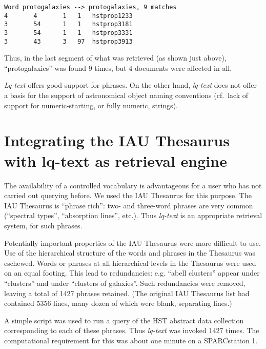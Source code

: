\begin{footnotesize}
\begin{verbatim}
Word protogalaxies --> protogalaxies, 9 matches
4       4       1   1   hstprop1233
3       54      1   1   hstprop3181
3       54      1   1   hstprop3331
3       43      3   97  hstprop3913

\end{verbatim}

\end{footnotesize}

Thus, in the last segment of what was retrieved (as shown just above), 
``protogalaxies'' was found 9 times, but 4 
documents were affected in all.

{\it Lq-text} offers good support for phrases.  
On the 
other hand, {\it lq-text} does not offer a basis for the support of 
astronomical object naming
conventions (cf.\ lack of support for numeric-starting, or fully numeric,
strings).  

\section{Integrating the IAU Thesaurus with lq-text as retrieval engine}

The availability of a controlled vocabulary is advantageous for a user
who has not carried out querying before.  We used the IAU Thesaurus for 
this purpose.  The IAU Thesaurus is ``phrase rich'': two- and three-word
phrases are very common (``spectral types'', ``absorption lines'', etc.).
Thus {\it lq-text} is an appropriate retrieval system, for such phrases.

Potentially important 
properties  of the IAU Thesaurus were more difficult to use.
Use of the hierarchical structure of the words and phrases in the Thesaurus 
was eschewed.  Words or phrases at all hierarchical levels in the Thesaurus
were used on an equal footing.  This lead to redundancies: e.g. ``abell 
clusters'' appear under ``clusters'' and under ``clusters of galaxies''.  
Such redundancies were removed, leaving a total of 1427 phrases retained. 
(The original IAU Thesaurus list had contained 5356 lines, many dozen of
which were blank, separating lines.)

A simple script was used to run a query of the HST abstract data collection
corresponding to each of these phrases.  Thus {\it lq-text} was invoked 
1427 times.  The computational requirement for this was about one minute on
a SPARCstation 1.  

